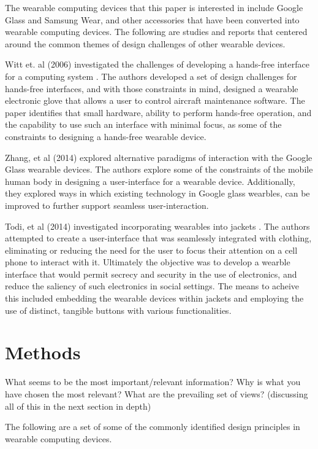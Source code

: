 \documentclass[12pt]{article}
\begin{document}
The wearable computing devices that this paper is interested in include Google Glass and Samsung Wear, and other accessories that have been converted into wearable computing devices. The following are studies and reports that centered around the common themes of design challenges of other wearable devices.

Witt et. al (2006) investigated the challenges of developing a hands-free interface for a computing system \cite{witt}. The authors developed a set of design challenges for hands-free interfaces, and with those constraints in mind, designed a wearable electronic glove that allows a user to control aircraft maintenance software. The paper identifies that small hardware, ability to perform hands-free operation, and the capability to use such an interface with minimal focus, as some of the constraints to designing a hands-free wearable device.

Zhang, et al (2014) explored alternative paradigms of interaction with the Google Glass wearable devices. The authors explore some of the constraints of the mobile human body in designing a user-interface for a wearable device. Additionally, they explored ways in which existing technology in Google glass wearbles, can be improved to further support seamless user-interaction. 

Todi, et al (2014) investigated incorporating wearables into jackets \cite{todi}. The authors attempted to create a user-interface that was seamlessly integrated with clothing, eliminating or reducing the need for the user to focus their attention on a cell phone to interact with it. Ultimately the objective was to develop a wearble interface that would permit secrecy and security in the use of electronics, and reduce the saliency of such electronics in social settings.  The means to acheive this included embedding the wearable devices within jackets and employing the use of distinct, tangible buttons with various functionalities.

\section{Methods} 
What seems to be the most important/relevant information? Why is what you have chosen the most relevant? What are the prevailing set of views? (discussing all of this in the next section in depth) 

The following are a set of some of the commonly identified design principles in wearable computing devices.
\end{document}
